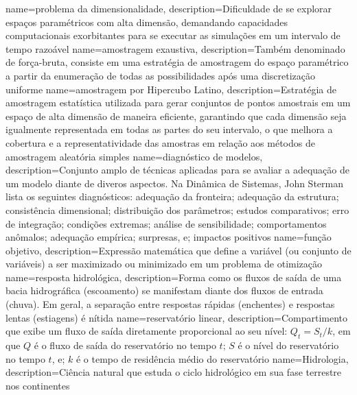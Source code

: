 {
    name=problema da dimensionalidade,
    description={Dificuldade de se explorar espaços paramétricos com alta dimensão, demandando capacidades computacionais exorbitantes para se executar as simulações em um intervalo de tempo razoável}
}
{
    name=amostragem exaustiva,
    description={Também denominado de força-bruta, consiste em uma estratégia de amostragem do espaço paramétrico a partir da enumeração de todas as possibilidades após uma discretização uniforme}
}
{
    name=amostragem por Hipercubo Latino,
    description={Estratégia de amostragem estatística utilizada para gerar conjuntos de pontos amostrais em um espaço de alta dimensão de maneira eficiente, garantindo que cada dimensão seja igualmente representada em todas as partes do seu intervalo, o que melhora a cobertura e a representatividade das amostras em relação aos métodos de amostragem aleatória simples}
}
{
    name=diagnóstico de modelos,
    description={Conjunto amplo de técnicas aplicadas para se avaliar a adequação de um modelo diante de diveros aspectos. Na Dinâmica de Sistemas, John Sterman lista os seguintes diagnósticos: adequação da fronteira; adequação da estrutura; consistência dimensional; distribuição dos parâmetros; estudos comparativos; erro de integração; condições extremas; análise de sensibilidade; comportamentos anômalos; adequação empírica; surpresas, e; impactos positivos}
}
{
    name=função objetivo,
    description={Expressão matemática que define a variável (ou conjunto de variáveis) a ser maximizado ou minimizado em um problema de otimização}
}
{
    name=resposta hidrológica,
    description={Forma como os fluxos de saída de uma bacia hidrográfica (escoamento) se manifestam diante dos fluxos de entrada (chuva). Em geral, a separação entre respostas rápidas (enchentes) e respostas lentas (estiagens) é nítida}
}
{
    name=reservatório linear,
    description={Compartimento que exibe um fluxo de saída diretamente proporcional ao seu nível: $Q_t = S_t/k$, em que $Q$ é o fluxo de saída do reservatório no tempo $t$; $S$ é o nível do reservatório no tempo $t$, e; $k$ é o tempo de residência médio do reservatório}
}
{
    name=Hidrologia,
    description={Ciência natural que estuda o ciclo hidrológico em sua fase terrestre nos continentes}
}

